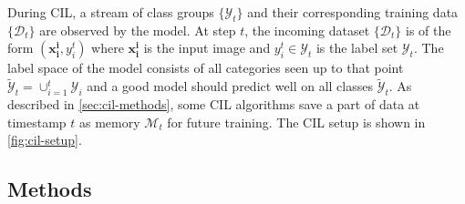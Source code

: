 During CIL, a stream of class groups $\{\mathcal{Y}_t\}$ and their corresponding training data $\{\mathcal{D}_t\}$ are observed by the model. At step $t$, the incoming dataset $\{\mathcal{D}_t\}$ is of the form $(\textbf{x}_{\textbf{i}}^{\textbf{i}}, y_i^t)$ where $\textbf{x}_{\textbf{i}}^{\textbf{i}}$ is the input image and $y_i^t \in \mathcal{Y}_t$ is the label set $\mathcal{Y}_t$. The label space of the model consists of all categories seen up to that point $\tilde{\mathcal{Y}}_t = \cup_{i=1}^t \mathcal{Y}_i$ and a good model should predict well on all classes $\tilde{\mathcal{Y}}_t$. As described in \autoref{sec:cil-methods}, some CIL algorithms save a part of data at timestamp $t$ as memory $\mathcal{M}_t$ for future training. The CIL setup is shown in \autoref{fig:cil-setup}.

\subsection{Methods}
\label{sec:pycil}
\label{sec:cil-methods}


